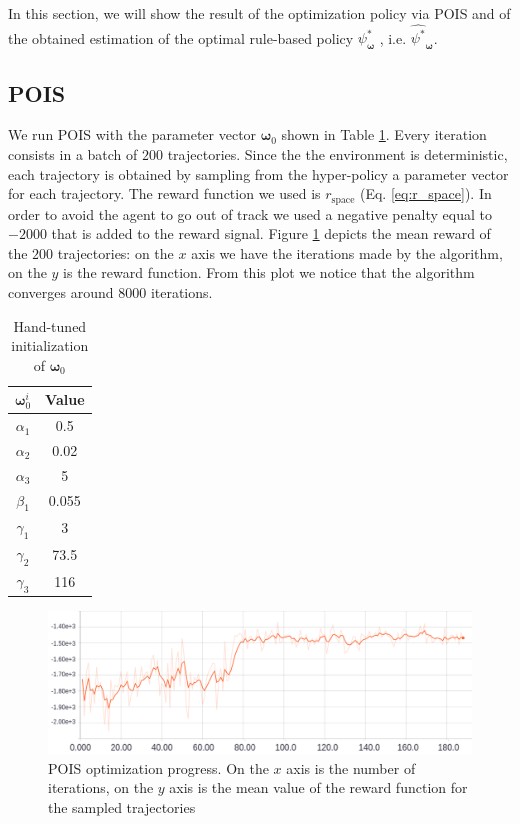 In this section, we will show the result of the optimization policy via POIS and of the obtained estimation of the optimal rule-based policy $\psi^*_{\boldsymbol \omega}$ , i.e. $\hat{\psi^*}_{\boldsymbol \omega}$.
\subsection{POIS}
We run POIS with the parameter vector $\boldsymbol {\omega}_0$ shown in Table \ref{tab:omega_0}. Every iteration consists in a batch of $200$ trajectories. Since the the environment is deterministic, each trajectory is obtained by sampling from the hyper-policy a parameter vector for each trajectory. The reward function we used is $r_{\text{space}}$ (Eq. \ref{eq:r_space}). In order to avoid the agent to go out of track we used a negative penalty equal to $-2000$ that is added to the reward signal. Figure \ref{fig:poislearning} depicts the mean reward of the $200$ trajectories: on the $x$ axis we have the iterations made by the algorithm, on the $y$ is the reward function. From this plot we notice that the algorithm converges around $8000$ iterations.

\begin{table}[H]

\centering
\begin{tabular}{|c|c|}
\hline
\textbf{$\boldsymbol {\omega}_0^i$} & \textbf{Value} \\ \hline
$\alpha_1$         & 0.5            \\ \hline
$\alpha_2$         & 0.02           \\ \hline
$\alpha_3$         & 5              \\ \hline
$\beta_1$          & 0.055          \\ \hline
$\gamma_1$         & 3          \\ \hline
$\gamma_2$         & 73.5          \\ \hline
$\gamma_3$         & 116          \\ \hline


\end{tabular}
\caption{Hand-tuned initialization of $\boldsymbol {\omega}_0$}
\label{tab:omega_0}
\end{table}




\begin{figure}[H]
\hspace*{-1cm}
 \centering
  \captionsetup{width=12cm}
  \includegraphics[width=14cm]{./img/optimiz}
  \caption{POIS optimization progress. On the $x$ axis is the number of iterations, on the $y$ axis is the mean value of the reward function for the sampled trajectories}
   \label{fig:poislearning}
\end{figure}

